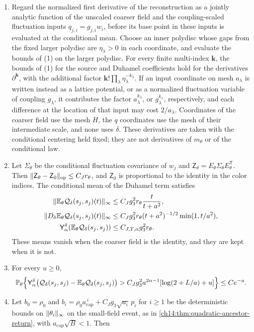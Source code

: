 \begin{theorem}
\begin{enumerate}
\item Regard the normalized first derivative of the reconstruction as a jointly analytic function of the unscaled coarser field and the coupling-scaled fluctuation inputs $q_{j,i}=g_{j,i}w_i$, before its base point in these inputs is evaluated at the conditional mean. Choose an inner polydisc whose gaps from the fixed larger polydisc are $\eta_\lambda>0$ in each coordinate, and evaluate the bounds of (1) on the larger polydisc. For every finite multi-index $\mathbf k$, the bounds of (1) for the source and Duhamel coefficients hold for the derivatives $\partial^{\mathbf k}$, with the additional factor $\mathbf k!\prod_\lambda\eta_\lambda^{-k_\lambda}$. If an input coordinate on mesh $a_\lambda$ is written instead as a lattice potential, or as a normalized fluctuation variable of coupling $g_\lambda$, it contributes the factor $a_\lambda^{k_\lambda}$, or $g_\lambda^{k_\lambda}$, respectively, and each difference at the location of that input may cost $2/a_\lambda$. Coordinates of the coarser field use the mesh $H$, the $q$ coordinates use the mesh of their intermediate scale, and none uses $\delta$. These derivatives are taken with the conditional centering held fixed; they are not derivatives of $m_\theta$ or of the conditional law.
\item Let $\Sigma_\theta$ be the conditional fluctuation covariance of $w_j$ and $\mathsf Z_\theta=E_\theta\Sigma_\theta E_\theta^{\mathsf T}$. Then $\lVert \mathsf Z_\theta-\mathsf Z_0\rVert_{\mathrm{op}}\le C_Jr_\theta$, and $\mathsf Z_0$ is proportional to the identity in the color indices. The conditional mean of the Duhamel term satisfies
\begin{align*}
 \lVert \mathbb E_\theta\mathcal Q_\delta(s_j,s_j)(t)\rVert_\infty&\le C_Jg_3^2r_\theta\frac{t}{t+a^2},\\
 \lVert D_\delta\mathbb E_\theta\mathcal Q_\delta(s_j,s_j)(t)\rVert_\infty&\le C_Jg_3^2r_\theta(t+a^2)^{-1/2}\min(1,t/a^2),\\
 \mathsf Y_{\alpha}^{\delta}(\mathbb E_\theta\mathcal Q_\delta(s_j,s_j))&\le C_{J,T,\alpha}g_3^2r_\theta.
\end{align*}
These means vanish when the coarser field is the identity, and they are kept when it is not.
\item For every $u\ge0$,
\[
 \mathbb P_\theta\Bigl\{\mathsf Y_{\alpha}^{\delta}\bigl(\mathcal Q_\delta(s_j,s_j)-\mathbb E_\theta\mathcal Q_\delta(s_j,s_j)\bigr)>C_Jg_3^2a^{2\alpha-1}[\log(2+L/a)+u]\Bigr\}\le Ce^{-u}.
\]
\item Let $b_0=\rho_0$ and $b_i=\rho_0a_{\mathrm{cap}}^{\,i}+C_Jg_3\sqrt{a_i}\,p_i$ for $i\ge1$ be the deterministic bounds on $\lVert \theta_i\rVert_\infty$ on the small-field event, as in \cref{ch14:thm:quadratic-ancestor-return}, with $a_{\mathrm{cap}}\sqrt B<1$. Then

\end{enumerate}
\end{theorem}
